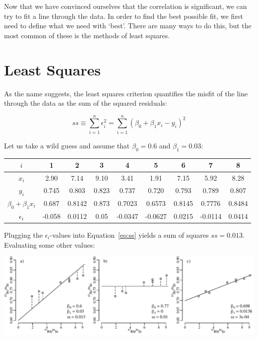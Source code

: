Now that we have convinced ourselves that the correlation is
significant, we can try to fit a line through the data. In order to
find the best possible fit, we first need to define what we need with
`best'. There are many ways to do this, but the most common of these
is the methods of least squares.

\section{Least Squares}
\label{sec:leastsquares}

As the name suggests, the least squares criterion quantifies the
misfit of the line through the data as the sum of the squared
residuals:

\begin{equation}
ss \equiv \sum_{i=1}^{n} \epsilon_i^2 = \sum_{i=1}^{n} (\beta_0 + \beta_1 x_i - y_i)^2
\label{eq:ss}
\end{equation}

Let us take a wild guess and assume that $\beta_0=0.6$ and
$\beta_1=0.03$:

\begin{center}
  \begin{tabular}{c|cccccccc}
    $i$ & 1 & 2 & 3 & 4 & 5 & 6 & 7 & 8 \\ \hline
    $x_i$ & 2.90 & 7.14 & 9.10 & 3.41 & 1.91 & 7.15 & 5.92 & 8.28 \\
    $y_i$ & 0.745 & 0.803 & 0.823 & 0.737 & 0.720 & 0.793 & 0.789 & 0.807 \\ \hline
    $\beta_0 + \beta_1 x_i$ & 0.687 & 0.8142 & 0.873 & 0.7023 &
    0.6573 & 0.8145 & 0.7776 & 0.8484 \\
    $\epsilon_i$ & -0.058 & 0.0112 & 0.05 & -0.0347 & -0.0627 &
    0.0215 & -0.0114 & 0.0414
  \end{tabular}
\end{center}

Plugging the $\epsilon_i$-values into Equation~\ref{eq:ss} yields a
sum of squares $ss=0.013$. Evaluating some other values:

\noindent\includegraphics[width=\textwidth]{../figures/tryRbSr.pdf}
\begingroup {} \endgroup

